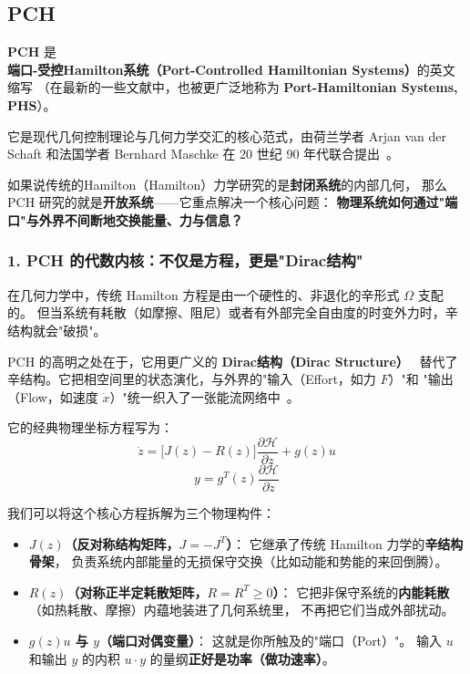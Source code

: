 ﻿\documentclass[10pt,a4paper]{article}
\numberwithin{equation}{section}
\begin{document}
\subsection{PCH}



\begin{framed}

\textbf{PCH} 是 \textbf{端口-受控Hamilton系统（Port-Controlled Hamiltonian Systems）}的英文缩写
（在最新的一些文献中，也被更广泛地称为 \textbf{Port-Hamiltonian Systems, PHS}）。

它是现代几何控制理论与几何力学交汇的核心范式，由荷兰学者 Arjan van der Schaft 和法国学者
Bernhard Maschke 在 20 世纪 90 年代联合提出~\cite{MaschkeVanDerSchaft1992,VanDerSchaftJeltsema2014}。

如果说传统的Hamilton（Hamilton）力学研究的是\textbf{封闭系统}的内部几何，
那么 PCH 研究的就是\textbf{开放系统}——它重点解决一个核心问题：
\textbf{物理系统如何通过"端口"与外界不间断地交换能量、力与信息？}

\subsubsection*{1. PCH 的代数内核：不仅是方程，更是"Dirac结构"}

在几何力学中，传统 Hamilton 方程是由一个硬性的、非退化的辛形式 $\Omega$ 支配的。
但当系统有耗散（如摩擦、阻尼）或者有外部完全自由度的时变外力时，辛结构就会"破损"。

PCH 的高明之处在于，它用更广义的 \textbf{Dirac结构（Dirac Structure）}~\cite{Courant1990}
替代了辛结构。它把相空间里的状态演化，与外界的"输入（Effort，如力 $F$）"和
"输出（Flow，如速度 $\dot{x}$）"统一织入了一张能流网络中~\cite{VanDerSchaftMaschke2002,VanDerSchaftJeltsema2014}。

它的经典物理坐标方程写为：
\begin{equation}
  \dot{z} = \bigl[J(z) - R(z)\bigr] \frac{\partial \mathcal{H}}{\partial z} + g(z)u
\end{equation}
\begin{equation}
  y = g^T(z) \frac{\partial \mathcal{H}}{\partial z}
\end{equation}

我们可以将这个核心方程拆解为三个物理构件：
\begin{itemize}
  \item \textbf{$J(z)$（反对称结构矩阵，$J = -J^T$）}：
  它继承了传统 Hamilton 力学的\textbf{辛结构骨架}，
  负责系统内部能量的无损保守交换（比如动能和势能的来回倒腾）。
  \item \textbf{$R(z)$（对称正半定耗散矩阵，$R = R^T \ge 0$）}：
  它把非保守系统的\textbf{内能耗散}（如热耗散、摩擦）内蕴地装进了几何系统里，
  不再把它们当成外部扰动。
  \item \textbf{$g(z)u$ 与 $y$（端口对偶变量）}：
  这就是你所触及的"端口（Port）"。
  输入 $u$ 和输出 $y$ 的内积 $u \cdot y$ 的量纲\textbf{正好是功率（做功速率）}。
\end{itemize}


\end{framed}
\end{document}
